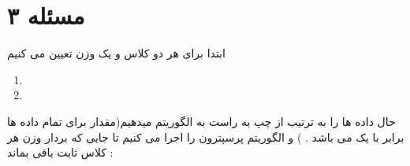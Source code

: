 \documentclass{article}
\begin{document}
\section*{مسئله ۳}
ابتدا برای هر دو کلاس 
و 
یک وزن تعیین می کنیم 
\begin{flushleft}
	\begin{enumerate}
		\item {}
		\item {}
	\end{enumerate}
\end{flushleft}
حال داده ها را به ترتیب از چپ به راست به الگوریتم میدهیم(مقدار
برای تمام داده ها برابر با یک می باشد  . 
)
 و الگوریتم پرسپترون را اجرا می کنیم تا جایی که بردار وزن هر کلاس
ثابت باقی بماند  : 
\end{document}
